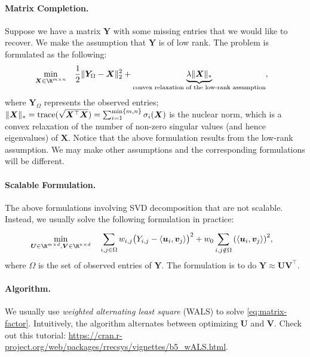         \paragraph{Matrix Completion.} 
        Suppose we have a matrix $\bm{Y}$ with some missing entries that we would like to recover. 
        We make the assumption that $\bm{Y}$ is of low rank.
        The problem is formulated as the following:
            \begin{equation}
                \begin{aligned}
                            & \min_{\bm{X} \in \R^{m \times n}} & & \frac{1}{2}\norm{\bm{Y}_\Omega - \bm{X}}_2^2 + \underbrace{\lambda \norm{\bm{X}}_\ast}_{\text{convex relaxation of the low-rank assumption}},
                \end{aligned}
            \end{equation}
        where $\bm{Y}_\Omega$ represents the observed entries; $\lVert\bm{X}\rVert_\ast = \text{trace}(\sqrt{\bm{X}^\top \bm{X}}) = \sum_{i=1}^{\min \{ m, n \}}{\sigma_i(\bm{X})}$ is the nuclear norm, which is a convex relaxation of the number of non-zero singular values (and hence eigenvalues) of $\bm{X}$.
        Notice that the above formulation results from the low-rank assumption.
        We may make other assumptions and the corresponding formulations will be different. 
    
        \paragraph{Scalable Formulation.} 
        The above formulations involving SVD decomposition that are not scalable.
        Instead, we usually solve the following formulation in practice:
            \begin{equation}\label{eq:matrix-factor}
                \begin{aligned}
                            & \min_{\bm{U} \in \R^{m \times d}, \bm{V} \in \R^{n \times d}} & & \sum_{i, j\in \Omega}^{}{ w_{i,j} \big(Y_{i,j} - \langle \bm{u}_i, \bm{v}_j \rangle \big)^2 +  w_0 \sum_{i,j \notin \Omega }^{}{ \left( \langle \bm{u}_i, \bm{v}_j \rangle \right)^2} },
                \end{aligned}
            \end{equation}
        where $\Omega$ is the set of observed entries of $\bm{Y}$.
        The formulation is to do $\bm{Y} \approx \bm{U} \bm{V}^\top$.
        
        \paragraph{Algorithm.} 
        We usually use \emph{weighted alternating least square} (WALS) to solve \eqref{eq:matrix-factor}.
        Intuitively, the algorithm alternates between optimizing $\bm{U}$ and $\bm{V}$.
        Check out this tutorial: \url{https://cran.r-project.org/web/packages/rrecsys/vignettes/b5_wALS.html}.
    
